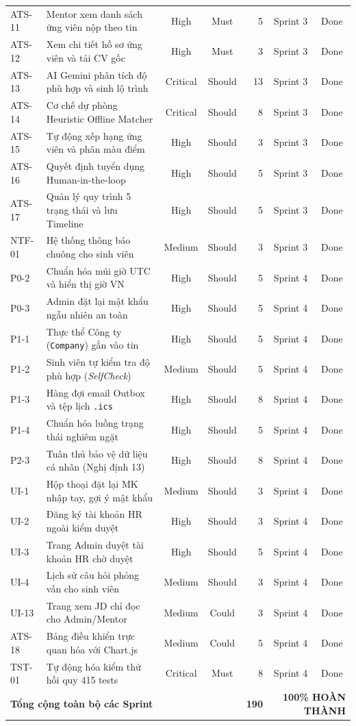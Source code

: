 \begin{longtable}{p{1.2cm} p{5.5cm} c c r c c}
\midrule
ATS-11 & Mentor xem danh sách ứng viên nộp theo tin & High & Must & 5 & Sprint 3 & Done \\
ATS-12 & Xem chi tiết hồ sơ ứng viên và tải CV gốc & High & Must & 3 & Sprint 3 & Done \\
ATS-13 & AI Gemini phân tích độ phù hợp và sinh lộ trình & Critical & Should & 13 & Sprint 3 & Done \\
ATS-14 & Cơ chế dự phòng Heuristic Offline Matcher & Critical & Should & 8 & Sprint 3 & Done \\
ATS-15 & Tự động xếp hạng ứng viên và phân màu điểm & High & Should & 3 & Sprint 3 & Done \\
ATS-16 & Quyết định tuyển dụng Human-in-the-loop & High & Should & 5 & Sprint 3 & Done \\
ATS-17 & Quản lý quy trình 5 trạng thái và lưu Timeline & High & Should & 5 & Sprint 3 & Done \\
NTF-01 & Hệ thống thông báo chuông cho sinh viên & Medium & Should & 3 & Sprint 3 & Done \\
\midrule
P0-2 & Chuẩn hóa múi giờ UTC và hiển thị giờ VN & High & Should & 5 & Sprint 4 & Done \\
P0-3 & Admin đặt lại mật khẩu ngẫu nhiên an toàn & High & Should & 5 & Sprint 4 & Done \\
P1-1 & Thực thể Công ty (\texttt{Company}) gắn vào tin & High & Should & 5 & Sprint 4 & Done \\
P1-2 & Sinh viên tự kiểm tra độ phù hợp (\textit{SelfCheck}) & Medium & Should & 5 & Sprint 4 & Done \\
P1-3 & Hàng đợi email Outbox và tệp lịch \texttt{.ics} & High & Should & 8 & Sprint 4 & Done \\
P1-4 & Chuẩn hóa luồng trạng thái nghiêm ngặt & High & Should & 5 & Sprint 4 & Done \\
P2-3 & Tuân thủ bảo vệ dữ liệu cá nhân (Nghị định 13) & High & Should & 8 & Sprint 4 & Done \\
UI-1 & Hộp thoại đặt lại MK nhập tay, gợi ý mật khẩu & Medium & Should & 3 & Sprint 4 & Done \\
UI-2 & Đăng ký tài khoản HR ngoài kiểm duyệt & High & Should & 3 & Sprint 4 & Done \\
UI-3 & Trang Admin duyệt tài khoản HR chờ duyệt & High & Should & 5 & Sprint 4 & Done \\
UI-4 & Lịch sử câu hỏi phỏng vấn cho sinh viên & Medium & Should & 3 & Sprint 4 & Done \\
UI-13 & Trang xem JD chỉ đọc cho Admin/Mentor & Medium & Could & 3 & Sprint 4 & Done \\
ATS-18 & Bảng điều khiển trực quan hóa với Chart.js & Medium & Could & 5 & Sprint 4 & Done \\
TST-01 & Tự động hóa kiểm thử hồi quy 415 tests & Critical & Must & 8 & Sprint 4 & Done \\
\midrule
\multicolumn{4}{l}{\textbf{Tổng cộng toàn bộ các Sprint}} & \textbf{190} & \multicolumn{2}{r}{\textbf{100\% HOÀN THÀNH}} \\
\end{longtable}
